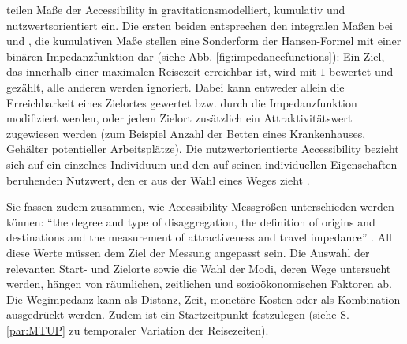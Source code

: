 \documentclass[11pt,pdftex,a4paper]{scrartcl}
\begin{document}
	\textcite{handyMeasuringAccessibilityExploration1997} teilen Maße der Accessibility in gravitationsmodelliert, kumulativ und nutzwertsorientiert ein. Die ersten beiden entsprechen den integralen Maßen bei \textcite{hansenHowAccessibilityShapes1959} und \textcite{ingramConceptAccessibilitySearch1971}, die kumulativen Maße stellen eine Sonderform der Hansen-Formel mit einer binären Impedanzfunktion dar (siehe Abb. \ref{fig:impedancefunctions}): Ein Ziel, das innerhalb einer maximalen Reisezeit erreichbar ist, wird mit $1$ bewertet und gezählt, alle anderen werden ignoriert. Dabei kann entweder allein die Erreichbarkeit eines Zielortes gewertet bzw. durch die Impedanzfunktion modifiziert werden, oder jedem Zielort zusätzlich ein Attraktivitätswert zugewiesen werden (zum Beispiel Anzahl der Betten eines Krankenhauses, Gehälter potentieller Arbeitsplätze). Die nutzwertorientierte Accessibility bezieht sich auf ein einzelnes Individuum und den auf seinen individuellen Eigenschaften beruhenden Nutzwert, den er aus der Wahl eines Weges zieht \parencite[1177]{handyMeasuringAccessibilityExploration1997}.
	
	Sie fassen zudem zusammen, wie Accessibility-Messgrößen unterschieden werden können: \enquote{the degree and type of disaggregation, the definition of origins and destinations and the measurement of attractiveness and travel impedance} \parencite[1178]{handyMeasuringAccessibilityExploration1997}. All diese Werte müssen dem Ziel der Messung angepasst sein. Die Auswahl der relevanten Start- und Zielorte sowie die Wahl der Modi, deren Wege untersucht werden, hängen von räumlichen, zeitlichen und sozioökonomischen Faktoren ab. Die Wegimpedanz kann als Distanz, Zeit, monetäre Kosten oder als Kombination ausgedrückt werden. Zudem ist ein Startzeitpunkt festzulegen (siehe S. \ref{par:MTUP} zu temporaler Variation der Reisezeiten).
	
\end{document}
